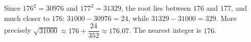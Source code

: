 Since $176^2=30976$ and $177^2=31329$, the root lies between $176$ and $177$, and much closer to $176$: $31000-30976=24$, while $31329-31000=329$. More precisely $\sqrt{31000}\approx176+\dfrac{24}{352}\approx176.07$. The nearest integer is $\boxed{176}$.
